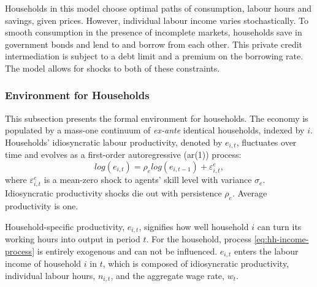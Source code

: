 \documentclass[a4paper,12pt]{article} %
\numberwithin{equation}{section} %
\numberwithin{figure}{section}
\numberwithin{table}{section}
\begin{document}
Households in this model choose optimal paths of consumption, labour hours and savings, given prices. However, individual labour income varies stochastically. To smooth consumption in the presence of incomplete markets, households save in government bonds and lend to and borrow from each other. This private credit intermediation is subject to a debt limit and a premium on the borrowing rate. The model allows for shocks to both of these constraints.

\subsubsection{Environment for Households}
\label{sec:model-hh-environment}

This subsection presents the formal environment for households. The economy is populated by a mass-one continuum of \textit{ex-ante} identical households, indexed by $i$. Households' idiosyncratic labour productivity, denoted by $e_{i,t}$, fluctuates over time and evolves as a first-order autoregressive (\Gls{ar}(1)) process:
\begin{equation}
    log(e_{i,t}) = \rho_e log(e_{i,t-1}) + \varepsilon^e_{i,t}, \label{eq:hh-income-process}
\end{equation}
where $\varepsilon^e_{i,t}$ is a mean-zero shock to agents' skill level with variance $\sigma_e$. Idiosyncratic productivity shocks die out with persistence $\rho_e$. Average productivity is one. %

Household-specific productivity, $e_{i,t}$, signifies how well household $i$ can turn its working hours into output in period $t$. For the household, process \eqref{eq:hh-income-process} is entirely exogenous and can not be influenced. $e_{i,t}$ enters the labour income of household $i$ in $t$, which is composed of idiosyncratic productivity, individual labour hours, $n_{i,t}$, and the aggregate wage rate, $w_t$.
\end{document}
